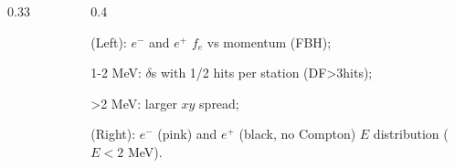 \documentclass{beamer}
\begin{document}
\begin{frame}
\begin{columns}
\begin{column}{0.33\framewidth}
\begin{figure}[!h]
           \label{fig:0pbarbefore}
\end{figure}
    \end{column}
       \begin{column}{0.4\framewidth}
        \setlength{\leftmargini}{0.5em}
        \begin{itemize}
           {\small 
           \item (Left): $e^-$ and $e^+$ $f_e$ vs momentum (FBH);
           \vspace{-0.5mm}
           \item 1-2 MeV: $\delta$s with 1/2 hits per station (DF>3hits);
                      \vspace{-0.5mm}
           \item >2 MeV: larger $xy$ spread;
                      \vspace{-4.5mm}
           \item (Right): $e^-$ (pink) and $e^+$ (black, no Compton) $E$ distribution ($E<2$ MeV).}
        \end{itemize}
    \end{column}
\end{columns}
   
\end{frame}
\end{document}
